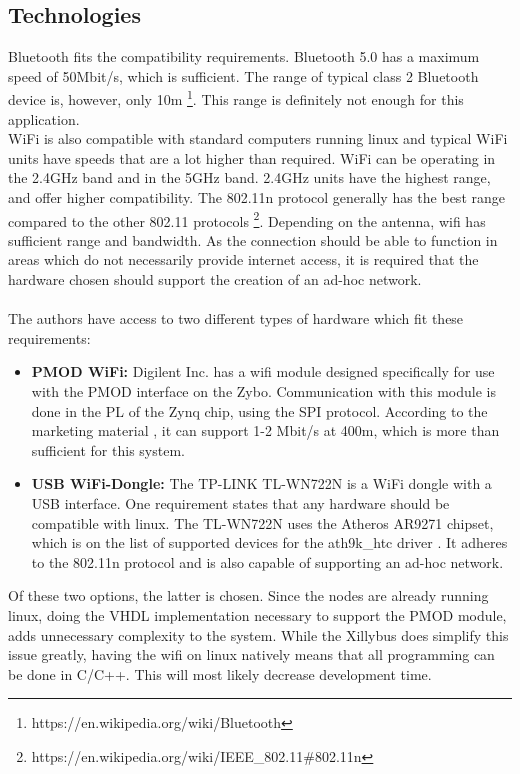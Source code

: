 \subsection{Technologies}
Bluetooth fits the compatibility requirements. 
Bluetooth 5.0 has a maximum speed of 50Mbit/s, which is sufficient.
The range of typical class 2 Bluetooth device is, however, only 10m \footnote{https://en.wikipedia.org/wiki/Bluetooth}.
This range is definitely not enough for this application.
\\
WiFi is also compatible with standard computers running linux and typical WiFi units have speeds that are a lot higher than required. 
WiFi can be operating in the 2.4GHz band and in the 5GHz band. 
2.4GHz units have the highest range, and offer higher compatibility. 
The 802.11n protocol generally has the best range compared to the other 802.11 protocols \footnote{https://en.wikipedia.org/wiki/IEEE\_802.11\#802.11n}.
Depending on the antenna, wifi has sufficient range and bandwidth.
As the connection should be able to function in areas which do not necessarily provide internet access, it is required that the hardware chosen should support the creation of an ad-hoc network.\\~\\
The authors have access to two different types of hardware which fit these requirements:
\begin{itemize}
	\item \textbf{PMOD WiFi:} Digilent Inc. has a wifi module designed specifically for use with the PMOD interface on the Zybo.
	Communication with this module is done in the PL of the Zynq chip, using the SPI protocol.
	According to the marketing material \cite{pmodwifi}, it can support 1-2 Mbit/s at 400m, which is more than sufficient for this system.
	\item \textbf{USB WiFi-Dongle:} The TP-LINK TL-WN722N is a WiFi dongle with a USB interface. One requirement states that any hardware should be compatible with linux.
	The TL-WN722N uses the Atheros AR9271 chipset, which is on the list of supported devices for the ath9k\_htc driver \cite{ath9k}.
	It adheres to the 802.11n protocol and is also capable of supporting an ad-hoc network.

\end{itemize}
Of these two options, the latter is chosen.
Since the nodes are already running linux, doing the VHDL implementation necessary to support the PMOD module, adds unnecessary complexity to the system.
While the Xillybus does simplify this issue greatly, having the wifi on linux natively means that all programming can be done in C/C++.
This will most likely decrease development time.
